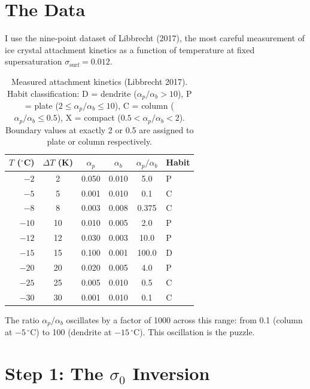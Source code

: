 \documentclass[12pt,letterpaper]{article}
\begin{document}
\section{The Data}
\label{sec:data}

I use the nine-point dataset of Libbrecht (2017), the most careful measurement of ice crystal attachment kinetics as a function of temperature at fixed supersaturation $\sigma_{\mathrm{surf}} = 0.012$.

\begin{table}[H]
\centering
\caption{Measured attachment kinetics (Libbrecht 2017).  Habit classification: D = dendrite ($\alpha_p/\alpha_b > 10$), P = plate ($2 \le \alpha_p/\alpha_b \le 10$), C = column ($\alpha_p/\alpha_b \le 0.5$), X = compact ($0.5 < \alpha_p/\alpha_b < 2$).  Boundary values at exactly 2 or 0.5 are assigned to plate or column respectively.}
\label{tab:data}
\begin{tabular}{@{}rccccl@{}}
\toprule
$T$ (${}^\circ$C) & $\Delta T$ (K) & $\alpha_p$ & $\alpha_b$ & $\alpha_p/\alpha_b$ & Habit \\
\midrule
$-2$  &  2 & 0.050 & 0.010 &   5.0 & P \\
$-5$  &  5 & 0.001 & 0.010 &   0.1 & C \\
$-8$  &  8 & 0.003 & 0.008 & 0.375 & C \\
$-10$ & 10 & 0.010 & 0.005 &   2.0 & P \\
$-12$ & 12 & 0.030 & 0.003 &  10.0 & P \\
$-15$ & 15 & 0.100 & 0.001 & 100.0 & D \\
$-20$ & 20 & 0.020 & 0.005 &   4.0 & P \\
$-25$ & 25 & 0.005 & 0.010 &   0.5 & C \\
$-30$ & 30 & 0.001 & 0.010 &   0.1 & C \\
\bottomrule
\end{tabular}
\end{table}

The ratio $\alpha_p/\alpha_b$ oscillates by a factor of 1000 across this range: from 0.1 (column at $-5\,{}^\circ$C) to 100 (dendrite at $-15\,{}^\circ$C).  This oscillation is the puzzle.

\section{Step 1: The $\sigma_0$ Inversion}
\label{sec:inversion}
\end{document}
